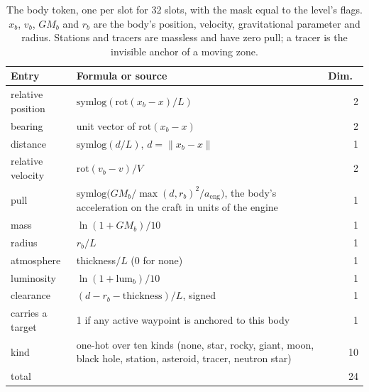 \begin{table}[htbp]
\centering
\footnotesize
\begin{tabular}{p{4.3cm}p{6.6cm}r}
\toprule
Entry & Formula or source & Dim.\ \\
\midrule
relative position & $\mathrm{symlog}(\mathrm{rot}(x_b - x)/L)$ & 2 \\
bearing & unit vector of $\mathrm{rot}(x_b - x)$ & 2 \\
distance & $\mathrm{symlog}(d/L)$, $d = \lVert x_b - x\rVert$ & 1 \\
relative velocity & $\mathrm{rot}(v_b - v)/V$ & 2 \\
pull & $\mathrm{symlog}\big(GM_b / \max(d, r_b)^2 / a_{\mathrm{eng}}\big)$, the body's acceleration on the craft in units of the engine & 1 \\
mass & $\ln(1 + GM_b)/10$ & 1 \\
radius & $r_b/L$ & 1 \\
atmosphere & thickness$/L$ (0 for none) & 1 \\
luminosity & $\ln(1 + \mathrm{lum}_b)/10$ & 1 \\
clearance & $(d - r_b - \text{thickness})/L$, signed & 1 \\
carries a target & 1 if any active waypoint is anchored to this body & 1 \\
kind & one-hot over ten kinds (none, star, rocky, giant, moon, black hole, station, asteroid, tracer, neutron star) & 10 \\
\midrule
total & & 24 \\
\bottomrule
\end{tabular}
\caption{The body token, one per slot for 32 slots, with the mask
 equal to the level's  flags. $x_b$, $v_b$, $GM_b$
and $r_b$ are the body's position, velocity, gravitational parameter and
radius. Stations and tracers are massless and have zero pull; a tracer is the
invisible anchor of a moving zone.}
\label{tab:obs-body}
\end{table}

